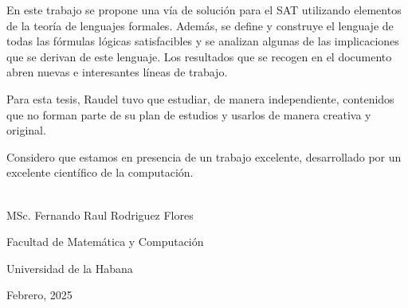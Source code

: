 \begin{opinion}
    En este trabajo se propone una vía de solución para el SAT utilizando elementos de la teoría de lenguajes formales.  Además, se define y construye el lenguaje de todas las fórmulas lógicas satisfacibles y se analizan algunas de las implicaciones que se derivan de este lenguaje.   Los resultados que se recogen en el documento abren nuevas e interesantes líneas de trabajo.

   Para esta tesis, Raudel tuvo que estudiar, de manera independiente, contenidos que no forman parte de su plan de estudios y usarlos de manera creativa y original.

   Considero que estamos en presencia de un trabajo excelente, desarrollado por un excelente científico de la computación.

   \vspace{1cm}


 \begin{flushright}
   \underline{\hspace{6.5cm}}\\
   MSc. Fernando Raul Rodriguez Flores

   Facultad de Matemática y Computación
  
   Universidad de la Habana

   Febrero, 2025
 \end{flushright}
\end{opinion}